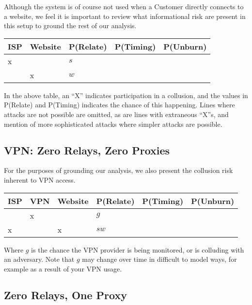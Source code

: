 Although the \Orchid{} system is of course not used when a Customer
directly connects to a website, we feel it is important to review what
informational risk are present in this setup to ground the rest of our
analysis.

\begin{center}
\begin{tabular}{l | l | l | l | l}
  ISP & Website & P(Relate)          & P(Timing)  & P(Unburn) \\
  \hline
  x   &         & $s$                & & \\
  \hline
      & x       & $w$                & & \\
\end{tabular}
\end{center}

In the above table, an ``X'' indicates participation in a collusion,
and the values in P(Relate) and P(Timing) indicates the chance of this
happening. Lines where attacks are not possible are omitted, as are
lines with extraneous ``X''s, and mention of more sophisticated
attacks where simpler attacks are possible.

\subsection{VPN: Zero Relays, Zero Proxies}

For the purposes of grounding our analysis, we also present the
collusion risk inherent to VPN access.

\begin{center}
\begin{tabular}{l | l | l | l | l | l}
  ISP & VPN & Website & P(Relate)          & P(Timing) & P(Unburn) \\
  \hline
      & x   &         & $g$                & & \\
  \hline
  x   &     & x       & $sw$               & & \\
\end{tabular}
\end{center}

Where $g$ is the chance the VPN provider is being monitored, or is
colluding with an adversary. Note that $g$ may change over time in
difficult to model ways, for example as a result of your VPN usage.

\subsection{Zero Relays, One Proxy}

